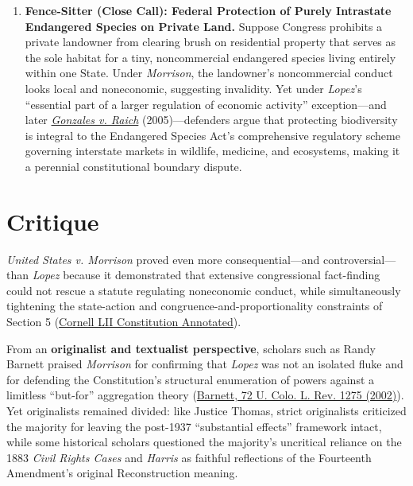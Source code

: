 \documentclass[12pt]{article}
\begin{document}
\begin{enumerate}
\item \textbf{Fence-Sitter (Close Call): Federal Protection of Purely Intrastate Endangered Species on Private Land.} Suppose Congress prohibits a private landowner from clearing brush on residential property that serves as the sole habitat for a tiny, noncommercial endangered species living entirely within one State. Under \textit{Morrison}, the landowner's noncommercial conduct looks local and noneconomic, suggesting invalidity. Yet under \textit{Lopez}'s ``essential part of a larger regulation of economic activity'' exception---and later \href{https://www.law.cornell.edu/supremecourt/text/03-1454}{\textit{Gonzales v. Raich}} (2005)---defenders argue that protecting biodiversity is integral to the Endangered Species Act's comprehensive regulatory scheme governing interstate markets in wildlife, medicine, and ecosystems, making it a perennial constitutional boundary dispute.
\end{enumerate}

\section{Critique}
\textit{United States v. Morrison} proved even more consequential---and controversial---than \textit{Lopez} because it demonstrated that extensive congressional fact-finding could not rescue a statute regulating noneconomic conduct, while simultaneously tightening the state-action and congruence-and-proportionality constraints of Section 5 (\href{https://www.law.cornell.edu/constitution-conan/amendment-10/the-commerce-clause-and-the-tenth-amendment}{Cornell LII Constitution Annotated}).

From an \textbf{originalist and textualist perspective}, scholars such as Randy Barnett praised \textit{Morrison} for confirming that \textit{Lopez} was not an isolated fluke and for defending the Constitution's structural enumeration of powers against a limitless ``but-for'' aggregation theory (\href{https://scholarship.law.georgetown.edu/cgi/viewcontent.cgi?article=1856&context=facpub}{Barnett, 72 U. Colo. L. Rev. 1275 (2002)}). Yet originalists remained divided: like Justice Thomas, strict originalists criticized the majority for leaving the post-1937 ``substantial effects'' framework intact, while some historical scholars questioned the majority's uncritical reliance on the 1883 \textit{Civil Rights Cases} and \textit{Harris} as faithful reflections of the Fourteenth Amendment's original Reconstruction meaning.
\end{document}
